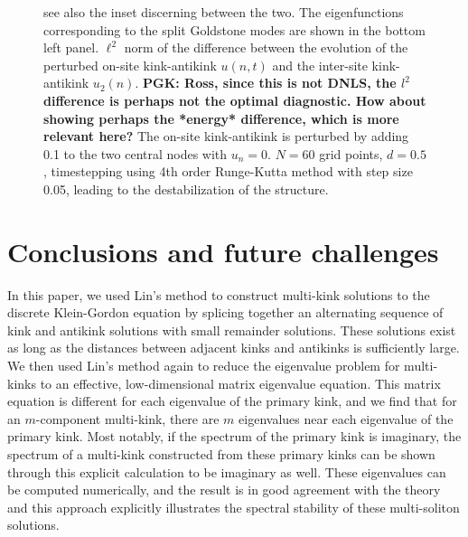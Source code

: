 \documentclass[12pt,reqno]{amsart}
\begin{document}
\begin{figure}[H]
{	see also the inset discerning between the two. The eigenfunctions corresponding to the split Goldstone modes are shown in the bottom left panel. $\ell^2$ norm of the difference between the evolution of the perturbed on-site kink-antikink $u(n,t)$ and the inter-site kink-antikink $u_2(n)$. 
	{\bf PGK: Ross, since this is not DNLS, the $l^2$ difference
	is perhaps not the optimal diagnostic. How about showing
	perhaps the *energy* difference, which is more relevant here?}
	The on-site kink-antikink is perturbed by adding 0.1 to the two central nodes with $u_n = 0$. $N=60$ grid points, $d = 0.5$, timestepping using 4th order Runge-Kutta method with step size 0.05, leading to the destabilization of the structure.} 
	\label{fig:unstablekak}
\end{figure}

\section{Conclusions and future challenges}\label{sec:conclusions}

In this paper, we used Lin's method to construct multi-kink solutions to the discrete Klein-Gordon equation by splicing together an alternating sequence of kink and antikink solutions with small remainder solutions. These solutions exist as long as the distances between adjacent kinks and antikinks is sufficiently large. We then used Lin's method again to reduce the eigenvalue problem for multi-kinks to an effective, low-dimensional matrix 
eigenvalue equation. This matrix equation is different for each eigenvalue of the primary kink, and we find that for an $m$-component multi-kink, there are $m$ eigenvalues near each eigenvalue of the primary kink. Most notably, if the spectrum of the primary kink is imaginary, the spectrum of a multi-kink constructed from these primary kinks can be shown through this
explicit calculation to be imaginary as well. These eigenvalues can be computed numerically, and the result is in good agreement with the theory and this approach explicitly illustrates the 
spectral stability of these multi-soliton solutions.
\end{document}

